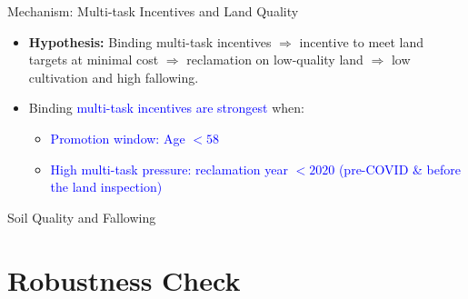 \documentclass[10pt, xcolor=x11names,compress, aspectratio=169]{beamer}
\begin{document}
\begin{frame}{Mechanism: Multi-task Incentives and Land Quality}

\begin{itemize}

    \item \textbf{Hypothesis:}  
    Binding multi-task incentives  
    $\Rightarrow$ incentive to meet land targets at minimal cost  
    $\Rightarrow$ reclamation on low-quality land  
    $\Rightarrow$ low cultivation and high fallowing.

    \item Binding \textcolor{blue}{multi-task incentives are strongest} when:
    \begin{itemize}
        \item \textcolor{blue}{Promotion window: Age $< 58$}
        \item \textcolor{blue}{High multi-task pressure: reclamation year $< 2020$ (pre-COVID \& before the land inspection)}
    \end{itemize}

\end{itemize}

\begin{table}[htbp]\centering

\end{table}

\end{frame}

\begin{frame}{Soil Quality and Fallowing}
    \begin{table}[htbp]\centering

\end{table}
\end{frame}


\section*{Robustness Check}
\end{document}
